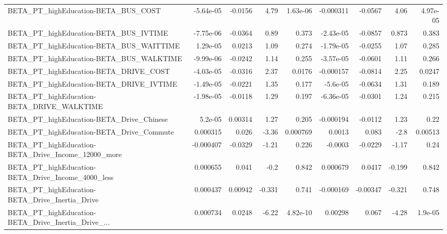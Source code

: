 \begin{tabular}{lrrrrrrrr}
BETA\_PT\_highEducation-BETA\_BUS\_COST                &   -5.64e-05 &      -0.0156 &     4.79 & 1.63e-06 &  -0.000311 &     -0.0567 &         4.06 &      4.97e-05 \\
BETA\_PT\_highEducation-BETA\_BUS\_IVTIME              &   -7.75e-06 &      -0.0364 &     0.89 &    0.373 &  -2.43e-05 &     -0.0857 &        0.873 &         0.383 \\
BETA\_PT\_highEducation-BETA\_BUS\_WAITTIME            &    1.29e-05 &       0.0213 &     1.09 &    0.274 &  -1.79e-05 &     -0.0255 &         1.07 &         0.285 \\
BETA\_PT\_highEducation-BETA\_BUS\_WALKTIME            &   -9.99e-06 &      -0.0242 &     1.14 &    0.255 &  -3.57e-05 &     -0.0601 &         1.11 &         0.266 \\
BETA\_PT\_highEducation-BETA\_DRIVE\_COST              &   -4.03e-05 &      -0.0316 &     2.37 &   0.0176 &  -0.000157 &     -0.0814 &         2.25 &        0.0247 \\
BETA\_PT\_highEducation-BETA\_DRIVE\_IVTIME            &   -1.49e-05 &      -0.0221 &     1.35 &    0.177 &   -5.6e-05 &     -0.0634 &         1.31 &         0.189 \\
BETA\_PT\_highEducation-BETA\_DRIVE\_WALKTIME          &   -1.98e-05 &      -0.0118 &     1.29 &    0.197 &  -6.36e-05 &     -0.0301 &         1.24 &         0.215 \\
BETA\_PT\_highEducation-BETA\_Drive\_Chinese           &     5.2e-05 &      0.00314 &     1.27 &    0.205 &  -0.000194 &     -0.0112 &         1.23 &          0.22 \\
BETA\_PT\_highEducation-BETA\_Drive\_Commute           &    0.000315 &        0.026 &    -3.36 & 0.000769 &     0.0013 &       0.083 &         -2.8 &       0.00513 \\
BETA\_PT\_highEducation-BETA\_Drive\_Income\_12000\_more &   -0.000407 &      -0.0329 &    -1.21 &    0.226 &    -0.0003 &     -0.0229 &        -1.17 &          0.24 \\
BETA\_PT\_highEducation-BETA\_Drive\_Income\_4000\_less  &    0.000655 &        0.041 &     -0.2 &    0.842 &   0.000679 &      0.0417 &       -0.199 &         0.842 \\
BETA\_PT\_highEducation-BETA\_Drive\_Inertia\_Drive     &    0.000437 &      0.00942 &   -0.331 &    0.741 &  -0.000169 &    -0.00347 &       -0.321 &         0.748 \\
BETA\_PT\_highEducation-BETA\_Drive\_Inertia\_Drive\_... &    0.000734 &       0.0248 &    -6.22 & 4.82e-10 &    0.00298 &       0.067 &        -4.28 &       1.9e-05 \\

\end{tabular}
